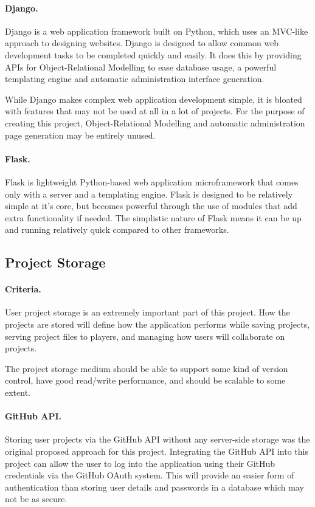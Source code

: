 \paragraph{Django.}
Django is a web application framework built on Python, which uses an MVC-like approach to designing websites.\cite{django} Django is designed to allow common web development tasks to be completed quickly and easily. It does this by providing APIs for Object-Relational Modelling to ease database usage, a powerful templating engine and automatic administration interface generation.\cite{djangooverview}

While Django makes complex web application development simple, it is bloated with features that may not be used at all in a lot of projects. For the purpose of creating this project, Object-Relational Modelling and automatic administration page generation may be entirely unused. 

\paragraph{Flask.}
Flask is lightweight Python-based web application microframework that comes only with a server and a templating engine. Flask is designed to be relatively simple at it's core, but becomes powerful through the use of modules that add extra functionality if needed.\cite{flask} The simplistic nature of Flask means it can be up and running relatively quick compared to other frameworks.

\subsection{Project Storage}
\paragraph{Criteria.}
User project storage is an extremely important part of this project. How the projects are stored will define how the application performs while saving projects, serving project files to players, and managing how users will collaborate on projects.

The project storage medium should be able to support some kind of version control, have good read/write performance, and should be scalable to some extent.

\paragraph{GitHub API.}
Storing user projects via the GitHub API without any server-side storage was the original proposed approach for this project.\cite{githubapi} Integrating the GitHub API into this project can allow the user to log into the application using their GitHub credentials via the GitHub OAuth system. \cite{githuboauth} This will provide an easier form of authentication than storing user details and passwords in a database which may not be as secure.

